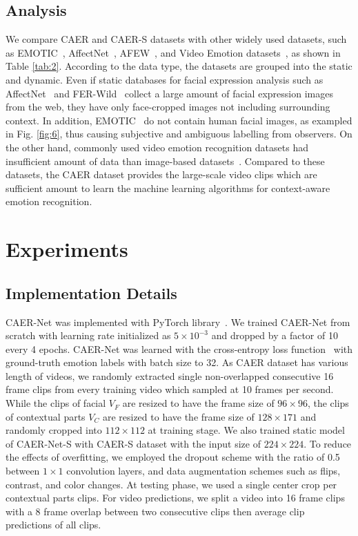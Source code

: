 \documentclass[10pt,twocolumn,letterpaper]{article}
\newcommand{\figref}[1]{Fig. \ref{#1}}
\newcommand{\tabref}[1]{Table \ref{#1}}
\begin{document}
\subsection{Analysis}\label{sec:42}
We compare CAER and CAER-S datasets with other widely used datasets, such as EMOTIC~\cite{kosti2017emotion}, AffectNet~\cite{mollahosseiniaffectnet}, AFEW~\cite{dhall2012collecting}, and Video Emotion datasets~\cite{jiang2014predicting}, as shown in \tabref{tab:2}. According to the data type, the datasets are grouped into the static and dynamic. Even if static databases for facial expression analysis such as AffectNet~\cite{mollahosseiniaffectnet} and FER-Wild~\cite{mollahosseini2016facial} collect a large amount of facial expression images from the web, they have only face-cropped images not including surrounding context.
In addition, EMOTIC~\cite{kosti2017emotion} do not contain human facial images, as exampled in \figref{fig:6}, thus causing subjective and ambiguous labelling from observers. On the other hand, commonly used video emotion recognition datasets had insufficient amount of data than image-based datasets~\cite{jiang2014predicting,kossaifi2017afew}.
Compared to these datasets, the CAER dataset provides the large-scale video clips which are sufficient amount to learn the machine learning algorithms for context-aware emotion recognition.


\section{Experiments}\label{sec:5}
\subsection{Implementation Details}\label{sec:51}
CAER-Net was implemented with PyTorch library~\cite{paszke2017automatic}.
We trained CAER-Net from scratch with learning rate initialized as $5 \times 10^{-3}$ and dropped by a factor of 10 every 4 epochs.
CAER-Net was learned with the cross-entropy loss function~\cite{kim2019unified} with ground-truth emotion labels with batch size to 32.
As CAER dataset has various length of videos, we randomly extracted single non-overlapped consecutive 16 frame clips from every training video which sampled at 10 frames per second.
While the clips of facial $V_F$ are resized to have the frame size of $96 \times 96$, the clips of contextual parts $V_C$ are resized to have the frame size of $128 \times 171$ and randomly cropped into $112 \times 112$ at training stage.
We also trained static model of CAER-Net-S with CAER-S dataset with the input size of $224 \times 224$.
To reduce the effects of overfitting, we employed the dropout scheme with the ratio of 0.5 between $1 \times 1$ convolution layers, and data augmentation schemes such as flips, contrast, and color changes.
At testing phase, we used a single center crop per contextual parts clips.
For video predictions, we split a video into 16 frame clips with a 8 frame overlap between two consecutive clips then average clip predictions of all clips.
\end{document}
